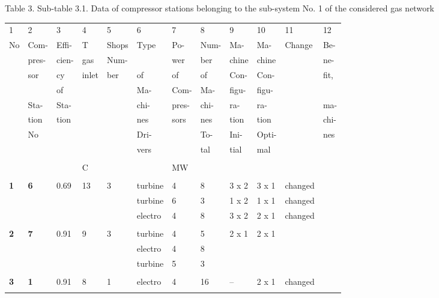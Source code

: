 \documentclass{article}
\begin{document}
\bigskip


\bigskip

\newpage

\bigskip

Table 3. Sub-table 3.1. Data of compressor stations belonging to the
sub-system No. 1 of the considered gas network

\bigskip

\begin{tabular}{llllllllllll}
1 & 2 & 3 & 4 & 5 & 6 & 7 & 8 & 9 & 10 & 11 & 12 \\ 
No & Com- & Effi- & T & Shops & Type & Po- & Num- & Ma- & Ma- & Change & Be-
\\ 
& pres- & cien- & gas & Num- &  & wer & ber & chine & chine &  & ne- \\ 
& sor & cy & inlet & ber & of & of & of & Con- & Con- &  & fit, \\ 
&  & of &  &  & Ma- & Com- & Ma- & figu- & figu- &  &  \\ 
& Sta- & Sta- &  &  & chi- & pres- & chi- & ra- & ra- &  & ma- \\ 
& tion & tion &  &  & nes & sors & nes & tion & tion &  & chi- \\ 
& No &  &  &  & Dri- &  & To- & Ini- & Opti- &  & nes \\ 
&  &  &  &  & vers &  & tal & tial & mal &  &  \\ 
&  &  &  &  &  &  &  &  &  &  &  \\ 
&  &  & C &  &  & MW &  &  &  &  &  \\ 
&  &  &  &  &  &  &  &  &  &  &  \\ 
\textbf{1} & \textbf{6} & 0.69 & 13 & 3 & turbine & 4 & 8 & 3 x 2 & 3 x 1 & 
changed &  \\ 
&  &  &  &  & turbine & 6 & 3 & 1 x 2 & 1 x 1 & changed &  \\ 
&  &  &  &  & electro & 4 & 8 & 3 x 2 & 2 x 1 & changed &  \\ 
&  &  &  &  &  &  &  &  &  &  &  \\ 
\textbf{2} & \textbf{7} & 0.91 & 9 & 3 & turbine & 4 & 5 & 2 x 1 & 2 x 1 & 
&  \\ 
&  &  &  &  & electro & 4 & 8 &  &  &  &  \\ 
&  &  &  &  & turbine & 5 & 3 &  &  &  &  \\ 
&  &  &  &  &  &  &  &  &  &  &  \\ 
\textbf{3} & \textbf{1} & 0.91 & 8 & 1 & electro & 4 & 16 & -- & 2 x 1 & 
changed &  \\ 
&  &  &  &  &  &  &  &  &  &  &  \\ 

\end{tabular}
\end{document}
